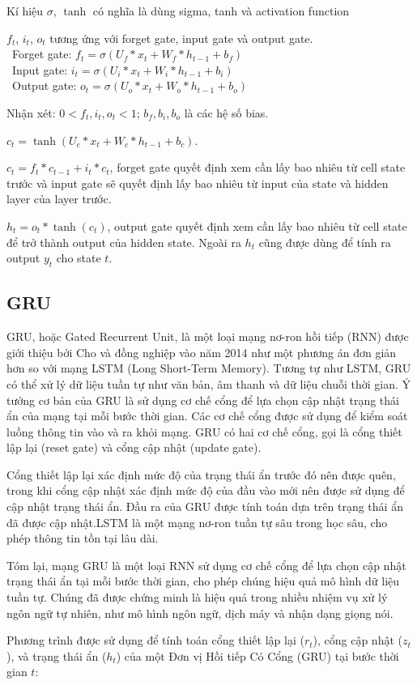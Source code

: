 Kí hiệu \(\sigma\), \(\tanh\) có nghĩa là dùng sigma, tanh và activation function
\par
\( f_t \), \( i_t \), \( o_t \) tương ứng với forget gate, input gate và output gate.\\
    \indent\textbullet\ Forget gate: \( f_t = \sigma\left(U_f \ast x_t + W_f \ast h_{t-1} + b_f\right) \)\\
    \indent\textbullet\ Input gate: \( i_t = \sigma\left(U_i \ast x_t + W_i \ast h_{t-1} + b_i\right) \)\\
    \indent\textbullet\ Output gate: \( o_t = \sigma\left(U_o \ast x_t + W_o \ast h_{t-1} + b_o\right) \)
\par
Nhận xét: \( 0 < f_t, i_t, o_t < 1 \); \( b_f, b_i, b_o \) là các hệ số bias.
\par
\( c_t = \tanh\left(U_c \ast x_t + W_c \ast h_{t-1} + b_c\right) \).
\par
\( c_t = f_t \ast c_{t-1} + i_t \ast c_t \), forget gate quyết định xem cần lấy bao nhiêu từ cell state trước và input gate sẽ quyết định lấy bao nhiêu từ input của state và hidden layer của layer trước.
\par
\( h_t = o_t \ast \tanh\left(c_t\right) \), output gate quyết định xem cần lấy bao nhiêu từ cell state để trở thành output của hidden state. Ngoài ra \( h_t \) cũng được dùng để tính ra output \( y_t \) cho state \( t \).


\subsection{GRU}
GRU, hoặc Gated Recurrent Unit, là một loại mạng nơ-ron hồi tiếp (RNN) được giới thiệu bởi Cho và đồng nghiệp vào năm 2014 như một phương án đơn giản hơn so với mạng LSTM (Long Short-Term Memory). Tương tự như LSTM, GRU có thể xử lý dữ liệu tuần tự như văn bản, âm thanh và dữ liệu chuỗi thời gian.
Ý tưởng cơ bản của GRU là sử dụng cơ chế cổng để lựa chọn cập nhật trạng thái ẩn của mạng tại mỗi bước thời gian. Các cơ chế cổng được sử dụng để kiểm soát luồng thông tin vào và ra khỏi mạng. GRU có hai cơ chế cổng, gọi là cổng thiết lập lại (reset gate) và cổng cập nhật (update gate).
\par
Cổng thiết lập lại xác định mức độ của trạng thái ẩn trước đó nên được quên, trong khi cổng cập nhật xác định mức độ của đầu vào mới nên được sử dụng để cập nhật trạng thái ẩn. Đầu ra của GRU được tính toán dựa trên trạng thái ẩn đã được cập nhật.LSTM là một mạng nơ-ron tuần tự sâu trong học sâu, cho phép thông tin tồn tại lâu dài.
\par
Tóm lại, mạng GRU là một loại RNN sử dụng cơ chế cổng để lựa chọn cập nhật trạng thái ẩn tại mỗi bước thời gian, cho phép chúng hiệu quả mô hình dữ liệu tuần tự. Chúng đã được chứng minh là hiệu quả trong nhiều nhiệm vụ xử lý ngôn ngữ tự nhiên, như mô hình ngôn ngữ, dịch máy và nhận dạng giọng nói.
\par
Phương trình được sử dụng để tính toán cổng thiết lập lại (\(r_t\)), cổng cập nhật (\(z_t\)), và trạng thái ẩn (\(h_t\)) của một Đơn vị Hồi tiếp Có Cổng (GRU) tại bước thời gian \(t\):

